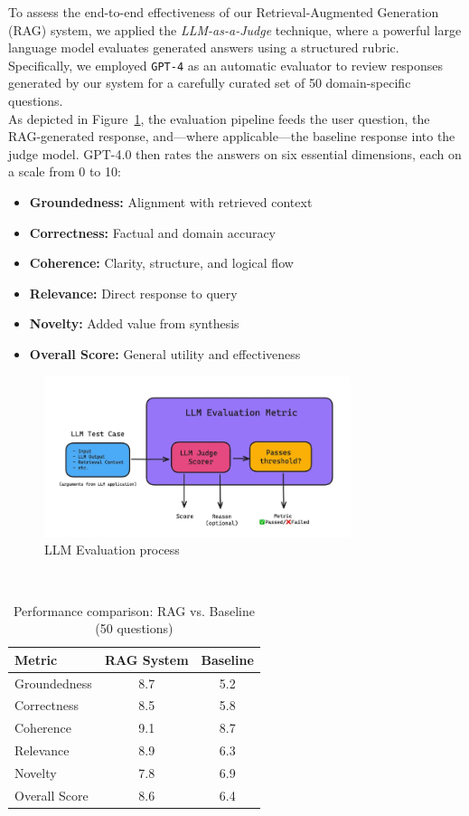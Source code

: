 To assess the end-to-end effectiveness of our Retrieval-Augmented Generation (RAG) system, we applied the \textit{LLM-as-a-Judge} technique, where a powerful large language model evaluates generated answers using a structured rubric. Specifically, we employed \texttt{GPT-4} as an automatic evaluator to review responses generated by our system for a carefully curated set of 50 domain-specific questions.\\
As depicted in Figure~\ref{fig:llm-judge}, the evaluation pipeline feeds the user question, the RAG-generated response, and—where applicable—the baseline response into the judge model. GPT-4.0 then rates the answers on six essential dimensions, each on a scale from 0 to 10:
\begin{itemize}
    \item \textbf{Groundedness:} Alignment with retrieved context
    \item \textbf{Correctness:} Factual and domain accuracy
    \item \textbf{Coherence:} Clarity, structure, and logical flow
    \item \textbf{Relevance:} Direct response to query
    \item \textbf{Novelty:} Added value from synthesis
    \item \textbf{Overall Score:} General utility and effectiveness
\end{itemize}
\begin{figure}[htbp]
  \centering
  \includegraphics[width=0.8\textwidth]{images/LLM_AS_JUDGE.png}
  \caption{LLM Evaluation process} %
  \label{fig:llm-judge}
\end{figure}
\\
\begin{table}[h]
    \centering
    \begin{tabular}{lcc}
        \toprule
        \textbf{Metric} & \textbf{RAG System} & \textbf{Baseline} \\
        \midrule
        Groundedness & 8.7 & 5.2 \\
        Correctness & 8.5 & 5.8 \\
        Coherence & 9.1 & 8.7 \\
        Relevance & 8.9 & 6.3 \\
        Novelty & 7.8 & 6.9 \\
        Overall Score & 8.6 & 6.4 \\
        \bottomrule
    \end{tabular}
    \caption{Performance comparison: RAG vs. Baseline (50 questions)}
    \label{tab:rag-vs-baseline}
\end{table}

